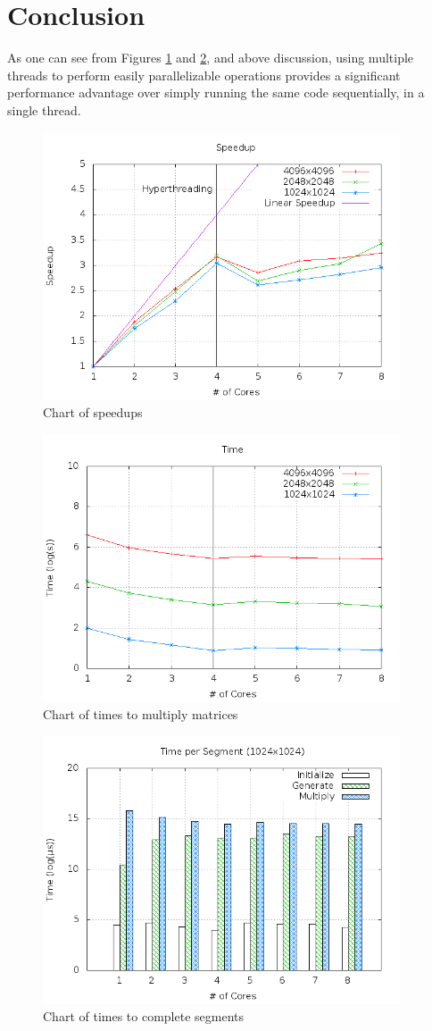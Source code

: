 \documentclass[11pt]{article}
\begin{document}
\section{Conclusion}
As one can see from Figures \ref{fig:speedup} and \ref{fig:time}, and above
discussion, using multiple threads to perform easily parallelizable operations
provides a significant performance advantage over simply running the same code
sequentially, in a single thread.
\begin{figure}
\centering
\includegraphics[width=300pt]{speedup.png}
\caption{Chart of speedups}
\label{fig:speedup}
\end{figure}
\begin{figure}
\centering
\includegraphics[width=300pt]{time.png}
\caption{Chart of times to multiply matrices}
\label{fig:time}
\end{figure}
\begin{figure}
\centering
\includegraphics[width=300pt]{segment.png}
\caption{Chart of times to complete segments}
\label{fig:segment}
\end{figure}
\pagebreak
\end{document}
